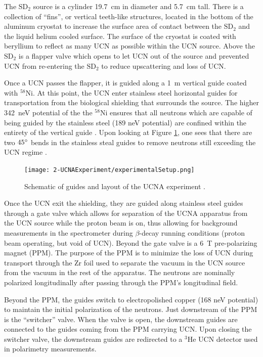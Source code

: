 The $\mathrm{SD}_2$ source is a cylinder 19.7~cm in diameter and 5.7~cm tall. There
is a collection of ``fins'', or vertical teeth-like structures, located in
the bottom of the aluminum cryostat to increase the surface area of contact between the
$\mathrm{SD}_2$ and the liquid helium cooled surface. The surface of the cryostat
is coated with beryllium to reflect as many UCN as possible within the UCN source. Above
the $\mathrm{SD}_2$ is a flapper valve which opens to let UCN out of the source and
prevented UCN from re-entering the $\mathrm{SD}_2$ to reduce upscattering and loss of UCN.

Once a UCN passes the flapper, it is guided along a 1~m vertical guide coated with $^{58}\mathrm{Ni}$.
At this point, the UCN enter stainless steel horizontal guides for transportation from
the biological shielding that surrounds the source. The higher 342~neV potential of the
the $^{58}\mathrm{Ni}$ ensures that all neutrons which are capable of being guided by the
stainless steel (189 neV potential) are confined within the entirety of the vertical guide
\cite{saunders2013performance}. Upon looking at Figure \ref{fig:guides}, one sees that
there are two $45\degree$ bends in the stainless steal guides to remove neutrons still
exceeding the UCN regime \cite{plaster2012}.

\begin{figure}[h]
  \centering
  \texttt{[image: 2-UCNAExperiment/experimentalSetup.png]} 
  \caption{Schematic of guides and layout of the UCNA experiment \cite{plaster2012}.}
  \label{fig:guides}
\end{figure}

Once the UCN exit the shielding, they are guided along stainless steel guides
through a gate valve which allows for separation of the UCNA apparatus from the UCN
source while the proton beam is on, thus allowing for background measurements in
the spectrometer
during $\beta$-decay running conditions (proton beam operating, but void of UCN).
Beyond the gate valve is a 6~T pre-polarizing magnet (PPM). The purpose of the PPM
is to minimize the loss of UCN during transport through the Zr foil used to separate
the vacuum in the UCN source from the vacuum in the rest of the apparatus. The neutrons
are nominally polarized longitudinally after passing through the PPM's longitudinal field.

Beyond the PPM, the guides switch to electropolished copper (168 neV potential) to
maintain the initial polarization of the neutrons. Just downstream of the PPM
is the ``switcher'' valve. When the valve is open, the downstream guides are connected
to the guides coming from the PPM carrying UCN. Upon closing the switcher valve,
the downstream guides are redirected to a $^3\mathrm{He}$ 
UCN detector \cite{morris2009multi} used in polarimetry measurements.

